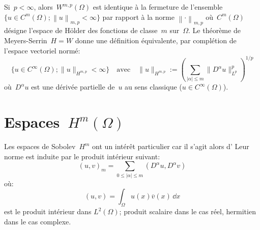 \medskip{}
Si~$p<\infty$, alors~$W^{m,p}(\Omega)$ est identique à la fermeture de l'ensemble
$\lbrace u \in C^m(\Omega) ; \left\|u \right\|_{m,p} < \infty \rbrace$ par rapport à la norme
$\left\|\cdot\right\|_{m,p}$ où~$C^m(\Omega)$ désigne l'espace de H\"older des fonctions de
classe~$m$ sur~$\Omega$.
\medskipvm
Le théorème de Meyers-Serrin~$H=W$ donne une définition équivalente, par complétion de l'espace
vectoriel normé:
\begin{equation}
\{u\in C^\infty(\Omega);\| u \|_{H^{m, p}} < \infty\}\quad\text{avec}\quad
\| u \|_{H^{m, p}}:= \left( \sum_{| \alpha | \leqslant m} \| D^{\alpha} u \|_{L^{p}}^p \right)^{1/p}
\end{equation}
où~$D^\alpha u$ est une dérivée partielle de~$u$ au sens classique ($u \in C^\infty(\Omega)$).


\medskip
\section{Espaces~$H^m(\Omega)$}

\begin{definition}
\end{definition}

\medskip
Les espaces de Sobolev~$H^m$ ont un intérêt particulier car il s'agit alors d'
Leur norme est induite par le produit intérieur suivant:
\begin{equation}(u,v)_{m} =\sum \limits _{0 \leqslant \vert \alpha\vert\leqslant m} \left( D^{\alpha} u, D^{\alpha} v\right)
\end{equation}
où: 
\begin{equation}(u,v) = \int_{\Omega} u(x) \overline{v}(x)\, \dd x
\end{equation}
est le produit intérieur dans $L^{2} ( \Omega)$; produit scalaire dans le cas réel, hermitien dans le cas complexe.

\medskip
{}

